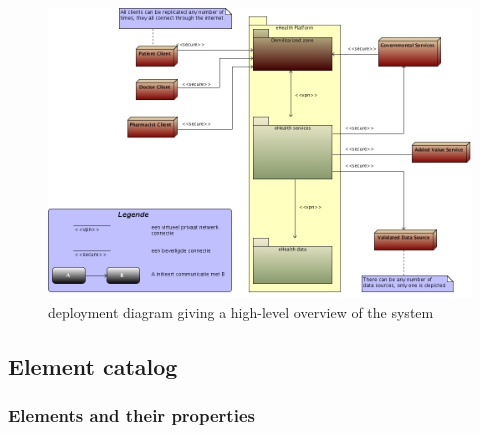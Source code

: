 \documentclass[a4paper,10pt]{article}
\begin{document}
\begin{figure}[!h]
  \includegraphics[width=\textwidth]{../images/deployment_DMZ.jpg}
    \caption{deployment diagram giving a high-level overview of the system}
\end{figure}

\subsection{Element catalog}

\subsubsection{Elements and their properties}
\end{document}
